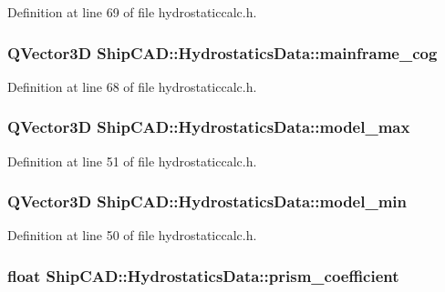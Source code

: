 Definition at line 69 of file hydrostaticcalc.\-h.

\hypertarget{structShipCAD_1_1HydrostaticsData_ab726ebe5c185d197a25e4477576266a4}{
\subsubsection[{mainframe\-\_\-cog}]{\setlength{\rightskip}{0pt plus 5cm}Q\-Vector3\-D Ship\-C\-A\-D\-::\-Hydrostatics\-Data\-::mainframe\-\_\-cog}}\label{structShipCAD_1_1HydrostaticsData_ab726ebe5c185d197a25e4477576266a4}


Definition at line 68 of file hydrostaticcalc.\-h.

\hypertarget{structShipCAD_1_1HydrostaticsData_a9319fb2ad054a595b6e3b3fd4059a3ae}{
\subsubsection[{model\-\_\-max}]{\setlength{\rightskip}{0pt plus 5cm}Q\-Vector3\-D Ship\-C\-A\-D\-::\-Hydrostatics\-Data\-::model\-\_\-max}}\label{structShipCAD_1_1HydrostaticsData_a9319fb2ad054a595b6e3b3fd4059a3ae}


Definition at line 51 of file hydrostaticcalc.\-h.

\hypertarget{structShipCAD_1_1HydrostaticsData_acd93669bc08fa097974d41fbaf4dc81f}{
\subsubsection[{model\-\_\-min}]{\setlength{\rightskip}{0pt plus 5cm}Q\-Vector3\-D Ship\-C\-A\-D\-::\-Hydrostatics\-Data\-::model\-\_\-min}}\label{structShipCAD_1_1HydrostaticsData_acd93669bc08fa097974d41fbaf4dc81f}


Definition at line 50 of file hydrostaticcalc.\-h.

\hypertarget{structShipCAD_1_1HydrostaticsData_acabee310fcde293fcb0d9a5fd5effe27}{
\subsubsection[{prism\-\_\-coefficient}]{\setlength{\rightskip}{0pt plus 5cm}float Ship\-C\-A\-D\-::\-Hydrostatics\-Data\-::prism\-\_\-coefficient}}\label{structShipCAD_1_1HydrostaticsData_acabee310fcde293fcb0d9a5fd5effe27}


